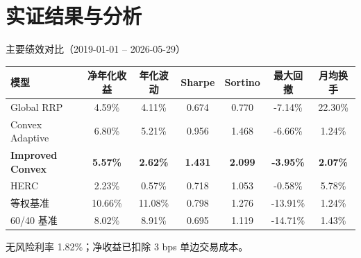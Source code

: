 \documentclass[aspectratio=169,11pt]{beamer}
\newcommand{\evalStartDate}{2019-01-01}
\newcommand{\evalEndDate}{2026-05-29}
\newcommand{\txCostBps}{3}
\newcommand{\riskFreeRate}{1.82\%}
\newcommand{\globalNetReturn}{4.59\%}
\newcommand{\globalVolatility}{4.11\%}
\newcommand{\globalSharpe}{0.674}
\newcommand{\globalSortino}{0.770}
\newcommand{\globalMaxDD}{-7.14\%}
\newcommand{\globalMonthlyTurnover}{22.30\%}
\newcommand{\convexNetReturn}{6.80\%}
\newcommand{\convexVolatility}{5.21\%}
\newcommand{\convexSharpe}{0.956}
\newcommand{\convexSortino}{1.468}
\newcommand{\convexMaxDD}{-6.66\%}
\newcommand{\convexMonthlyTurnover}{1.24\%}
\newcommand{\improvedNetReturn}{5.57\%}
\newcommand{\improvedVolatility}{2.62\%}
\newcommand{\improvedSharpe}{1.431}
\newcommand{\improvedSortino}{2.099}
\newcommand{\improvedMaxDD}{-3.95\%}
\newcommand{\improvedMonthlyTurnover}{2.07\%}
\newcommand{\hercNetReturn}{2.23\%}
\newcommand{\hercVolatility}{0.57\%}
\newcommand{\hercSharpe}{0.718}
\newcommand{\hercSortino}{1.053}
\newcommand{\hercMaxDD}{-0.58\%}
\newcommand{\hercMonthlyTurnover}{5.78\%}
\newcommand{\equalWeightNetReturn}{10.66\%}
\newcommand{\equalWeightVolatility}{11.08\%}
\newcommand{\equalWeightSharpe}{0.798}
\newcommand{\equalWeightSortino}{1.276}
\newcommand{\equalWeightMaxDD}{-13.91\%}
\newcommand{\equalWeightMonthlyTurnover}{1.24\%}
\newcommand{\sixtyFortyNetReturn}{8.02\%}
\newcommand{\sixtyFortyVolatility}{8.91\%}
\newcommand{\sixtyFortySharpe}{0.695}
\newcommand{\sixtyFortySortino}{1.119}
\newcommand{\sixtyFortyMaxDD}{-14.71\%}
\newcommand{\sixtyFortyMonthlyTurnover}{1.43\%}
\begin{document}
\section{实证结果与分析}

\begin{frame}{主要绩效对比（\evalStartDate{} -- \evalEndDate）}
  \footnotesize
  \renewcommand{\arraystretch}{1.3}
  \begin{center}
    \begin{tabular}{@{}lcccccc@{}}
      \toprule
      模型 & 净年化收益 & 年化波动 & Sharpe & Sortino & 最大回撤 & 月均换手 \\
      \midrule
      Global RRP        & \globalNetReturn  & \globalVolatility  & \globalSharpe  & \globalSortino  & \globalMaxDD  & \globalMonthlyTurnover \\
      Convex Adaptive   & \convexNetReturn  & \convexVolatility  & \convexSharpe  & \convexSortino  & \convexMaxDD  & \convexMonthlyTurnover \\
      \rowcolor{swufeLight}
      \textbf{Improved Convex} & \textbf{\improvedNetReturn} & \textbf{\improvedVolatility} & \textbf{\improvedSharpe} & \textbf{\improvedSortino} & \textbf{\improvedMaxDD} & \textbf{\improvedMonthlyTurnover} \\
      HERC              & \hercNetReturn    & \hercVolatility    & \hercSharpe    & \hercSortino    & \hercMaxDD    & \hercMonthlyTurnover \\
      \midrule
      等权基准          & \equalWeightNetReturn & \equalWeightVolatility & \equalWeightSharpe & \equalWeightSortino & \equalWeightMaxDD & \equalWeightMonthlyTurnover \\
      60/40 基准        & \sixtyFortyNetReturn & \sixtyFortyVolatility & \sixtyFortySharpe & \sixtyFortySortino & \sixtyFortyMaxDD & \sixtyFortyMonthlyTurnover \\
      \bottomrule
    \end{tabular}
  \end{center}
  \vspace{0.2em}
  \scriptsize 无风险利率 \riskFreeRate{}；净收益已扣除 \txCostBps{} bps 单边交易成本。
\end{frame}
\end{document}
